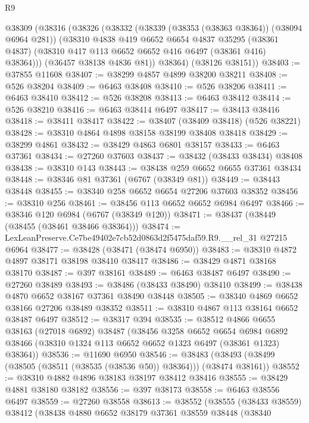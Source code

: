 \begin{lexlean}{R9}
\begin{coremodule}
    @38309
      (@38316
        (@38326
          (@38332
            (@38339 (@38353 (@38363 @38364)) (@38094 @6964 @281))
            (@38310
              @4838
              @419
              @6652
              @6654
              @4837
              @35295
              (@38361 @4837)
              (@38310 @417 @113 @6652 @6652 @416 @6497 (@38361 @416) @38364)))
          (@36457 @38138 @4836 @81))
        @38364)
      (@38126 @38151))
@38403 := @37855 @11608
@38407 := @38299 @4857 @4899 @38200 @38211
@38408 := @526 @38204
@38409 := @6463 @38408
@38410 := @526 @38206
@38411 := @6463 @38410
@38412 := @526 @38208
@38413 := @6463 @38412
@38414 := @526 @38210
@38416 := @6463 @38414 @6497
@38417 := @38413 @38416
@38418 := @38411 @38417
@38422 := @38407 (@38409 @38418) (@526 @38221)
@38428 := @38310 @4864 @4898 @38158 @38199 @38408 @38418
@38429 := @38299 @4861
@38432 := @38429 @4863 @6801 @38157
@38433 := @6463 @37361
@38434 := @27260 @37603
@38437 := @38432 (@38433 @38434) @38408
@38438 := @38310 @143
@38443 := @38438 @259 @6652 @6655 @37361 @38434
@38448 := @38346 @81 @37361 (@6767 (@38349 @81))
@38449 := @38443 @38448
@38455 := @38340 @258 @6652 @6654 @27206 @37603 @38352
@38456 := @38310 @256
@38461 := @38456 @113 @6652 @6652 @6984 @6497
@38466 := @38346 @120 @6984 (@6767 (@38349 @120))
@38471 := @38437 (@38449 (@38455 (@38461 @38466 @38364)))
@38474 := LexLeanPreserve.Ce7be49402e7cb52d0863d2f5475daf59.R9.__rel_31 @27215 @6964
@38477 := @38428 (@38471 (@38474 @6950))
@38483 := @38310 @4872 @4897 @38171 @38198 @38410 @38417
@38486 := @38429 @4871 @38168 @38170
@38487 := @397 @38161
@38489 := @6463 @38487 @6497
@38490 := @27260 @38489
@38493 := @38486 (@38433 @38490) @38410
@38499 := @38438 @4870 @6652 @38167 @37361 @38490 @38448
@38505 := @38340 @4869 @6652 @38166 @27206 @38489 @38352
@38511 := @38310 @4867 @113 @38164 @6652 @38487 @6497
@38512 := @38317 @394
@38535 := @38512
    @4866
    @6655
    @38163
    (@27018 @6892)
    @38487
    (@38456
      @3258
      @6652
      @6654
      @6984
      @6892
      @38466
      (@38310 @1324 @113 @6652 @6652 @1323 @6497 (@38361 @1323) @38364))
@38536 := @11690 @6950
@38546 := @38483 (@38493 (@38499 (@38505 (@38511 (@38535 (@38536 @50)) @38364))) (@38474 @38161))
@38552 := @38310 @4882 @4896 @38183 @38197 @38412 @38416
@38555 := @38429 @4881 @38180 @38182
@38556 := @397 @38173
@38558 := @6463 @38556 @6497
@38559 := @27260 @38558
@38613 := @38552
    (@38555
      (@38433 @38559)
      @38412
      (@38438
        @4880
        @6652
        @38179
        @37361
        @38559
        @38448
        (@38340

\end{coremodule}
\end{lexlean}
